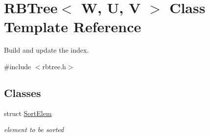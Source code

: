 \hypertarget{classRBTree}{\section{R\-B\-Tree$<$ W, U, V $>$ Class Template Reference}
\label{classRBTree}
}


Build and update the index.  




{\ttfamily \#include $<$rbtree.\-h$>$}

\subsection*{Classes}
\begin{DoxyCompactItemize}
\item 
struct \hyperlink{structRBTree_1_1SortElem}{Sort\-Elem}
\begin{DoxyCompactList}\small\item\em element to be sorted \end{DoxyCompactList}\end{DoxyCompactItemize}
